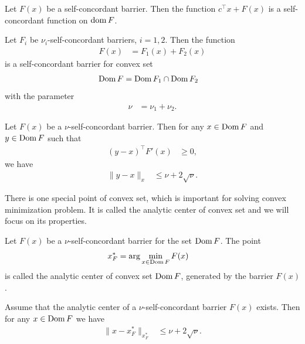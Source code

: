\begin{theorem}
  Let $F(x)$ be a self-concordant barrier. Then the function $c^\top x + F(x)$ is a self-concordant function on $\operatorname{dom} F$.
\end{theorem}

\begin{theorem}
  Let $F_i$ be $\nu_i$-self-concordant barriers, $i = 1,2$. Then the function
  \begin{align}
    F(x) &= F_1(x) + F_2(x)
  \end{align}
  is a self-concordant barrier for convex set
  \begin{align}
    \operatorname{Dom} F &= \operatorname{Dom} F_1 \cap \operatorname{Dom} F_2
  \end{align}
  with the parameter
  \begin{align}
    \nu &= \nu_1 + \nu_2.
  \end{align}
\end{theorem}

\begin{theorem}
  Let $F(x)$ be a $\nu$-self-concordant barrier. Then for any $x\in\operatorname{Dom} F$ and $y\in\operatorname{Dom} F$ such that
  \begin{align}
    (y-x)^\top F'(x) &\geq 0,
  \end{align}
  we have
  \begin{align}
    \|y-x\|_x &\leq \nu + 2\sqrt{\nu}.
  \end{align}
\end{theorem}

There is one special point of convex set, which is important for solving convex minimization problem. 
It is called the analytic center of convex set and we will focus on its properties.

\begin{definition}
  Let $F(x)$ be a $\nu$-self-concordant barrier for the set $\operatorname{Dom} F$. The point
  \begin{align}
    x^*_F &= \arg \min_{x\in\Dom F} F(x) \labeleq{SDP:scb:ac}
  \end{align}
  is called the analytic center of convex set $\operatorname{Dom} F$, generated by the barrier $F(x)$.
\end{definition}

\begin{theorem}
  Assume that the analytic center of a $\nu$-self-concordant barrier $F(x)$ exists. Then for any $x\in\operatorname{Dom} F$ we have
  \begin{align}
    \|x-x^*_F\|_{x^*_F} &\leq \nu + 2\sqrt{\nu}.
  \end{align}
\end{theorem}


